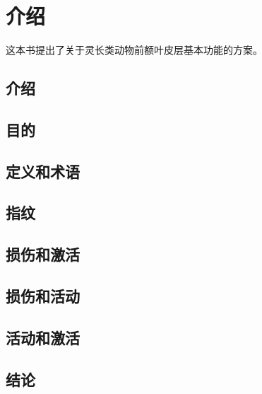 \chapter{介绍}
这本书提出了关于灵长类动物前额叶皮层基本功能的方案。

\section{介绍}

\section{目的}

\section{定义和术语}


\section{指纹}

\section{损伤和激活}

\section{损伤和活动}

\section{活动和激活}




\section{结论}


